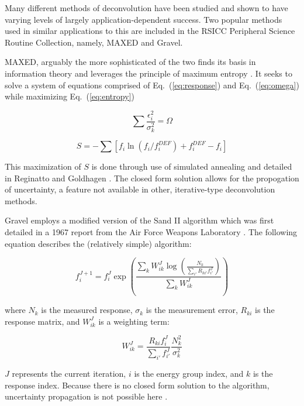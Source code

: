 \documentclass[journal]{IEEEtran}
\newcommand{\EQ}[1]{Eq.~(\ref{#1})}               %
\begin{document}
Many different methods of deconvolution have been studied and shown to have varying levels of largely application-dependent success.
Two popular methods used in similar applications to this are included in the RSICC Peripheral Science Routine Collection, namely, MAXED and Gravel.

MAXED, arguably the more sophisticated of the two finds its basis in information theory and leverages the principle of maximum entropy \cite{reginatto1999maxed}.
It seeks to solve a system of equations comprised of \EQ{eq:response} and \EQ{eq:omega} while maximizing \EQ{eq:entropy}

\begin{equation}
  \sum \frac{\epsilon_i^2}{\sigma_k^2} = \Omega
\label{eq:omega}
\end{equation}

\begin{equation}
  S = - \sum [f_i \ln(f_i/f_i^{DEF}) + f_i^{DEF} - f_i]
\label{eq:entropy}
\end{equation}

This maximization of $S$ is done through use of simulated annealing and detailed in Reginatto and Goldhagen \cite{reginatto1999maxed}.
The closed form solution allows for the propogation of uncertainty, a feature not available in other, iterative-type deconvolution methods.

Gravel employs a modified version of the Sand II algorithm which was first detailed in a 1967 report from the Air Force Weapons Laboratory \cite{mcelroy1967computer}.
The following equation describes the (relatively simple) algorithm:

\begin{equation}
 f_i^{J+1} = f_i^{J} \exp(\frac{\sum_k W_{ik}^J \log(\frac{N_k}{\sum_{i'} R_{ki'}f_{i'}^J})}{\sum_k W_{ik}^J}) 
\label{eq:sand}
\end{equation}

where $N_k$ is the measured response, $\sigma_k$ is the measurement error, $R_{ki}$ is the response matrix, and $W_{ik}^J$ is a weighting term:

\begin{equation}
 W_{ik}^J = \frac{R_{ki} f_i^J}{\sum_{i'} f_{i'}^J} \frac{N_k^2}{\sigma_k^2} 
\label{eq:weighting}
\end{equation}

$J$ represents the current iteration, $i$ is the energy group index, and $k$ is the response index.
Because there is no closed form solution to the algorithm, uncertainty propagation is not possible here \cite{reginatto2004umg}.
\end{document}
